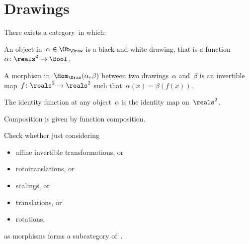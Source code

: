 
\section{Drawings}

\begin{definition}[Drawings]
    There exists a category~\Draw in which:
    \begin{compactenum}
        \item An object in~$\alpha\in \Ob_\Draw$ is a black-and-white drawing,
        that is a function~$\alpha \colon \reals^2 \to \Bool$.
        \item A morphism in~$\Hom_{\Draw}(\alpha, \beta)$ between two drawings~$\alpha$ and~$\beta$ is an invertible map~$f\colon \reals^2 \to \reals^2$ such that~$\alpha(x) = \beta(f(x))$.
        \item The identity function at any object~$\alpha$ is the identity map
        on~$\reals^2$.
        \item Composition is given by function composition.
    \end{compactenum}
\end{definition}

\begin{exercise}
    Check whether just considering
    \begin{itemize}
        \item affine invertible transformations, or
        \item rototranslations, or
        \item scalings, or
        \item translations, or
        \item rotations,
    \end{itemize}
    as morphisms forms a subcategory of~\Draw.
\end{exercise}

